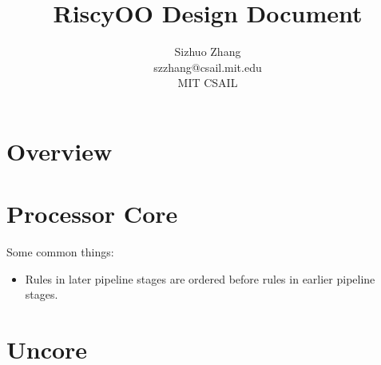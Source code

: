 \documentclass[12pt]{article}
\begin{document}
\title{RiscyOO Design Document}
\author{Sizhuo Zhang \\ szzhang@csail.mit.edu \\ MIT CSAIL}
\date{}
\maketitle

\section{Overview}


\section{Processor Core}

Some common things:
\begin{itemize}
    \item Rules in later pipeline stages are ordered before rules in earlier pipeline stages.
\end{itemize}





\section{Uncore}
\end{document}
